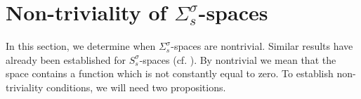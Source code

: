 \documentclass[11pt,a4paper,reqno]{amsart}
\numberwithin{equation}{section}
\theoremstyle{definition}
\newtheorem{prop}[thm]{Proposition}
\theoremstyle{definition}
\begin{document}

\section{Non-triviality of
$\Sigma_s^\sigma$-spaces}\label{sec:nontriv}
In this section, we determine when $\Sigma_s^\sigma$-spaces are nontrivial. Similar results have already been established for $S_s^\sigma$-spaces (cf. \cite{gel}). By nontrivial we mean that the space contains a function which is not constantly equal to zero. To establish non-triviality conditions, we will need two propositions.
\end{document}
